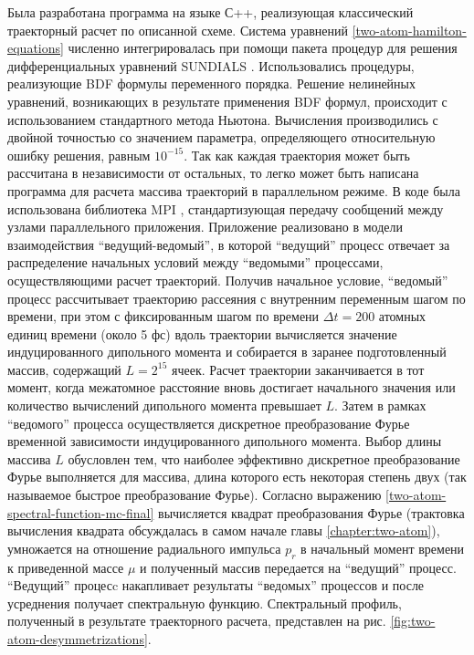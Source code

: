Была разработана программа на языке С++, реализующая классический траекторный расчет по описанной схеме. Система уравнений \eqref{two-atom-hamilton-equations} численно интегрировалась при помощи пакета процедур для решения дифференциальных уравнений SUNDIALS \cite{sundials}. Использовались процедуры, реализующие BDF формулы переменного порядка. Решение нелинейных уравнений, возникающих в результате применения BDF формул, происходит с использованием стандартного метода Ньютона. Вычисления производились с двойной точностью со значением параметра, определяющего относительную ошибку решения, равным $10^{-15}$. Так как каждая траектория может быть рассчитана в независимости от остальных, то легко может быть написана программа для расчета массива траекторий в параллельном режиме. В коде была использована библиотека MPI \cite{mpi}, стандартизующая передачу сообщений между узлами параллельного приложения. Приложение реализовано в модели взаимодействия \enquote{ведущий-ведомый}, в которой \enquote{ведущий} процесс отвечает за распределение начальных условий между \enquote{ведомыми} процессами, осуществляющими расчет траекторий. Получив начальное условие, \enquote{ведомый} процесс рассчитывает траекторию рассеяния с внутренним переменным шагом по времени, при этом с фиксированным шагом по времени $\Delta t = 200$ атомных единиц времени (около 5 фс) вдоль траектории вычисляется значение индуцированного дипольного момента и собирается в заранее подготовленный массив, содержащий $L = 2^{15}$ ячеек. Расчет траектории заканчивается в тот момент, когда межатомное расстояние вновь достигает начального значения или количество вычислений дипольного момента превышает $L$. Затем в рамках \enquote{ведомого} процесса осуществляется дискретное преобразование Фурье временной зависимости индуцированного дипольного момента. Выбор длины массива $L$ обусловлен тем, что наиболее эффективно дискретное преобразование Фурье выполняется для массива, длина которого есть некоторая степень двух (так называемое быстрое преобразование Фурье). Согласно выражению \eqref{two-atom-spectral-function-mc-final} вычисляется квадрат преобразования Фурье (трактовка вычисления квадрата обсуждалась в самом начале главы \ref{chapter:two-atom}), умножается на отношение радиального импульса $p_r$ в начальный момент времени к приведенной массе $\mu$ и полученный массив передается на \enquote{ведущий} процесс. \enquote{Ведущий} процесc накапливает результаты \enquote{ведомых} процессов и после усреднения получает спектральную функцию.
    Спектральный профиль, полученный в результате траекторного расчета, представлен на рис. \ref{fig:two-atom-desymmetrizations}.
